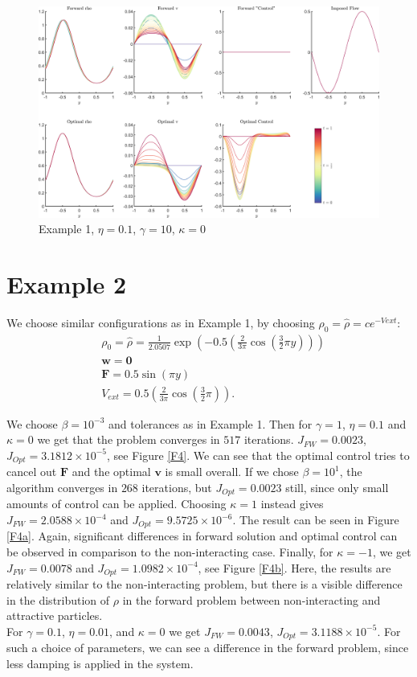 \documentclass[11pt, a4paper]{article}
\theoremstyle{definition}
\newcommand{\w}{\mathbf{w}}
\begin{document}
	\begin{figure}[h]
		\centering
		\includegraphics[scale=0.04]{Example1b.png}
		\caption{Example 1, $\eta = 0.1$, $\gamma = 10$, $\kappa = 0$} 
		\label{F3}
	\end{figure}
	
	\section*{Example 2}
	We choose similar configurations as in Example 1, by choosing $\rho_0 = \widehat \rho = c e^{-V{ext}}$:
	\begin{align*}
	&\rho_0 = \widehat \rho = \frac{1}{2.0507} \exp\left(-0.5\left(\frac{2}{3 \pi}\cos\left(\frac{3}{2}\pi y\right)\right) \right)\\
	&\w = \mathbf 0 \\
	&\mathbf{F} = 0.5 \sin(\pi y)\\
	&V_{ext} = 0.5 \left(\frac{2}{3 \pi}\cos\left(\frac{3}{2}\pi \right) \right).
	\end{align*}
	
	We choose $ \beta = 10^{-3}$ and tolerances as in Example 1. Then for $\gamma = 1$, $\eta = 0.1$ and $\kappa = 0$ we get that the problem converges in $517$ iterations. $J_{FW} = 0.0023$, $J_{Opt} = 3.1812 \times 10^{-5}$, see Figure \ref{F4}. We can see that the optimal control tries to cancel out $\mathbf F$ and the optimal $\mathbf v$ is small overall. If we chose $\beta = 10^1$, the algorithm converges in $268$ iterations, but $J_{Opt} =0.0023$ still, since only small amounts of control can be applied.
	Choosing $\kappa = 1$ instead gives $J_{FW} = 2.0588 \times 10^{-4}$ and $J_{Opt} = 9.5725 \times 10^{-6}$. The result can be seen in Figure \ref{F4a}. Again, significant differences in forward solution and optimal control can be observed in comparison to the non-interacting case. 
	Finally, for $\kappa = -1$, we get $J_{FW} = 0.0078$ and $J_{Opt} = 1.0982 \times 10^{-4}$, see Figure \ref{F4b}. Here, the results are relatively similar to the non-interacting problem, but there is a visible difference in the distribution of $\rho$ in the forward problem between non-interacting and attractive particles.
	\\
	For $\gamma = 0.1$, $\eta = 0.01$, and $\kappa = 0$ we get $J_{FW} = 0.0043$, $J_{Opt} = 3.1188 \times 10^{-5}$. For such a  choice of parameters, we can see a difference in the forward problem, since less damping is applied in the system.
	
\end{document}
